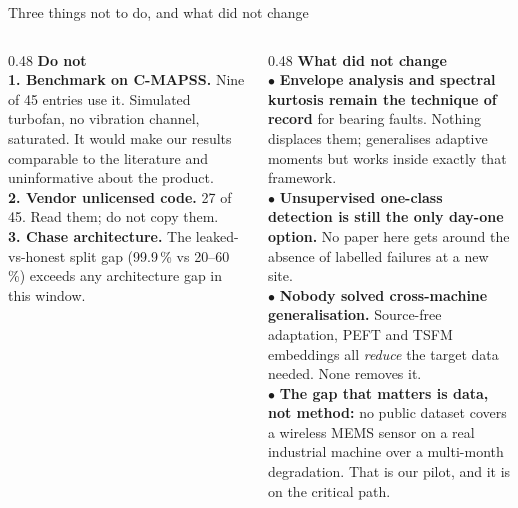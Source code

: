 \documentclass[aspectratio=169,10pt]{beamer}
\begin{document}
\begin{frame}{Three things not to do, and what did not change}
  \begin{columns}[T]
    \begin{column}{0.48\textwidth}
      \small\textbf{Do not}
      \\[1.5mm]
      \scriptsize
      \textbf{1. Benchmark on C-MAPSS.} Nine of 45 entries use it. Simulated
      turbofan, no vibration channel, saturated. It would make our results
      comparable to the literature and uninformative about the product.
      \\[1.5mm]
      \textbf{2. Vendor unlicensed code.} 27 of 45. Read them; do not copy them.
      \\[1.5mm]
      \textbf{3. Chase architecture.} The leaked-vs-honest split gap
      (99.9\,\% vs 20--60\,\%) exceeds any architecture gap in this window.
    \end{column}
    \begin{column}{0.48\textwidth}
      \small\textbf{What did not change}
      \\[1.5mm]
      \scriptsize
      $\bullet$ \textbf{Envelope analysis and spectral kurtosis remain the
      technique of record} for bearing faults. Nothing displaces them;
       generalises adaptive moments but works inside exactly
      that framework.
      \\[1mm]
      $\bullet$ \textbf{Unsupervised one-class detection is still the only
      day-one option.} No paper here gets around the absence of labelled
      failures at a new site.
      \\[1mm]
      $\bullet$ \textbf{Nobody solved cross-machine generalisation.}
      Source-free adaptation, PEFT and TSFM embeddings all \emph{reduce} the
      target data needed. None removes it.
      \\[1mm]
      $\bullet$ \textbf{The gap that matters is data, not method:} no public
      dataset covers a wireless MEMS sensor on a real industrial machine over a
      multi-month degradation. That is our pilot, and it is on the critical
      path.
    \end{column}
  \end{columns}
\end{frame}
\end{document}
